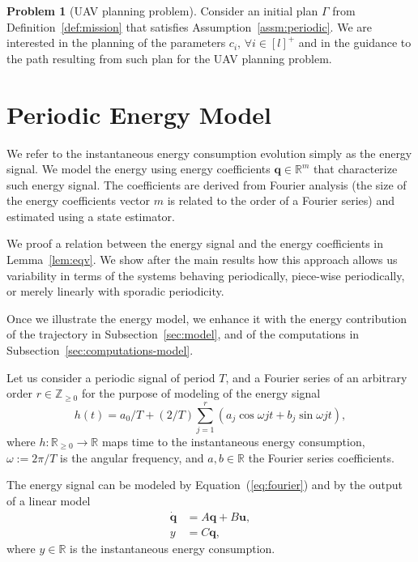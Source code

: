 \documentclass[letterpaper,10pt,conference]{ieeeconf}
\theoremstyle{definition}
\newtheorem{pb}{Problem}[section]
\begin{document}
\begin{pb}[UAV planning problem]\label{pb}
  Consider an initial plan $\Gamma$ from Definition~\ref{def:mission} that satisfies Assumption~\ref{assm:periodic}. We are interested in the planning of the parameters $c_i,\,\forall i\in[l]^+$ and in the guidance to the path resulting from such plan for the UAV planning problem.
\end{pb}



\section{Periodic Energy Model}
\label{sec:energy-model}

We refer to the instantaneous energy consumption evolution simply as the energy signal. We model the energy using energy coefficients $\mathbf{q}\in\mathbb{R}^m$ that characterize such energy signal. The coefficients are derived from Fourier analysis (the size of the energy coefficients vector $m$ is related to the order of a Fourier series) and estimated using a state estimator. %

We proof a relation between the energy signal and the energy coefficients in Lemma~\ref{lem:eqv}. We show after the main results how this approach allows us variability in terms of the systems behaving periodically, piece-wise periodically, or merely linearly with sporadic periodicity.

Once we illustrate the energy model, we enhance it with the energy contribution of the trajectory in Subsection~\ref{sec:model}, and of the computations in Subsection~\ref{sec:computations-model}. 

Let us consider a periodic signal of period $T$, and a Fourier series of an arbitrary order $r\in\mathbb{Z}_{\geq 0}$ for the purpose of modeling of the energy signal
\begin{equation}\label{eq:fourier}
  h(t)=a_0/T+(2/T)\sum_{j=1}^{r}{\left(a_j\cos{\omega jt}+b_j\sin{\omega jt}\right)},
\end{equation}
where $h:\mathbb{R}_{\geq 0}\rightarrow\mathbb{R}$ maps time to the instantaneous energy consumption, $\omega:=2\pi/T$ is the angular frequency, and $a,b\in\mathbb{R}$ the Fourier series coefficients.

The energy signal can be modeled by Equation~(\ref{eq:fourier}) and by the output of a linear model
\begin{equation}\label{eq:state-perf}\begin{split}
  \dot{\mathbf{q}}&=A\mathbf{q}+B\mathbf{u},\\
  y&=C\mathbf{q},
\end{split}\end{equation}
where $y\in\mathbb{R}$ is the instantaneous energy consumption. 
\end{document}
